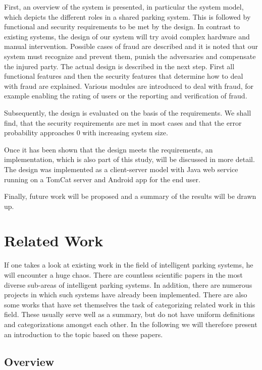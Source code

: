 \documentclass[
a4paper,     %
titlepage,   %
14pt         %
]{scrartcl}  %
\theoremstyle{mystyle}
\begin{document}
First, an overview of the system is presented, in particular the system model, which depicts the different roles in a shared parking system. This is followed by functional and security requirements to be met by the design. In contrast to existing systems, the design of our system will try avoid complex hardware and manual intervention. Possible cases of fraud are described and it is noted that our system must recognize and prevent them, punish the adversaries and compensate the injured party. The actual design is described in the next step. First all functional features and then the security features that determine how to deal with fraud are explained. Various modules are introduced to deal with fraud, for example enabling the rating of users or the reporting and verification of fraud. 

Subsequently, the design is evaluated on the basis of the requirements. We shall find, that the security requirements are met in most cases and that the error probability approaches 0 with increasing system size.

Once it has been shown that the design meets the requirements, an implementation, which is also part of this study, will be discussed in more detail. The design was implemented as a client-server model with Java web service running on a TomCat server and Android app for the end user.

Finally, future work will be proposed and a summary of the results will be drawn up.

\section{Related Work}
If one takes a look at existing work in the field of intelligent parking systems, he will encounter a huge chaos. There are countless scientific papers in the most diverse sub-areas of intelligent parking systems. In addition, there are numerous projects in which such systems have already been implemented. There are also some works that have set themselves the task of categorizing related work in this field. These usually serve well as a summary, but do not have uniform definitions and categorizations amongst each other. In the following we will therefore present an introduction to the topic based on these papers.

\subsection{Overview}
\end{document}
